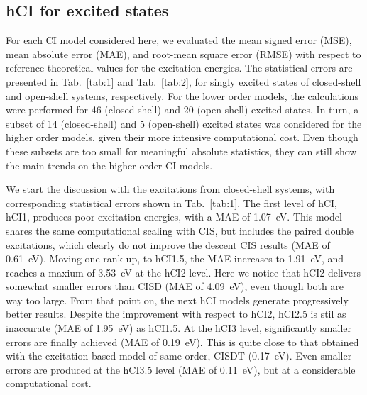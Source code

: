 \documentclass[aip,jcp,reprint,noshowkeys,superscriptaddress]{revtex4-1}
\begin{document}

 


\subsection{hCI for excited states}
\label{sec:res_B}


For each CI model considered here, we evaluated the mean signed error (MSE), mean absolute error (MAE), and root-mean square error (RMSE) 
with respect to reference theoretical values for the excitation energies.
The statistical errors are presented in Tab.~\ref{tab:1} and Tab.~\ref{tab:2},
for singly excited states of closed-shell and open-shell systems, respectively.
For the lower order models, the calculations were performed for 46 (closed-shell) and 20 (open-shell) excited states.
In turn, a subset of 14 (closed-shell) and 5 (open-shell) excited states was considered for the higher order models, given their more intensive computational cost.
Even though these subsets are too small for meaningful absolute statistics, they can still show the main trends on the higher order CI models.


We start the discussion with the excitations from closed-shell systems, with corresponding statistical errors shown in Tab.~\ref{tab:1}.
%
The first level of hCI, hCI1, produces poor excitation energies, with a MAE of \SI{1.07}{\eV}.
This model shares the same computational scaling with CIS, but includes the paired double excitations, 
which clearly do not improve the descent CIS results (MAE of \SI{0.61}{\eV}).
Moving one rank up, to hCI1.5, the MAE increases to \SI{1.91}{\eV}, and reaches a maxium of \SI{3.53}{\eV} at the hCI2 level.
Here we notice that hCI2 delivers somewhat smaller errors than CISD (MAE of \SI{4.09}{\eV}), even though both are way too large.
From that point on, the next hCI models generate progressively better results.
Despite the improvement with respect to hCI2, hCI2.5 is stil as inaccurate (MAE of \SI{1.95}{\eV}) as hCI1.5.
At the hCI3 level, significantly smaller errors are finally achieved (MAE of \SI{0.19}{\eV}).
This is quite close to that obtained with the excitation-based model of same order, CISDT (\SI{0.17}{\eV}).
Even smaller errors are produced at the hCI3.5 level (MAE of \SI{0.11}{\eV}), but at a considerable computational cost.
\end{document}
